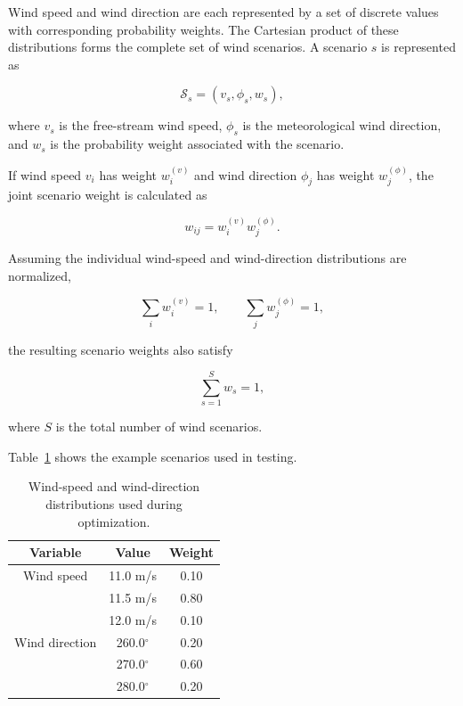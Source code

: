 \documentclass[11pt]{article}
\begin{document}
Wind speed and wind direction are each represented by a set of discrete values with corresponding probability weights. The Cartesian product of these distributions forms the complete set of wind scenarios. A scenario $s$ is represented as

\begin{equation}
    \mathcal{S}_s =
    \left(v_s,\phi_s,w_s\right),
\end{equation}

where $v_s$ is the free-stream wind speed, $\phi_s$ is the meteorological wind direction, and $w_s$ is the probability weight associated with the scenario.

If wind speed $v_i$ has weight $w_i^{(v)}$ and wind direction $\phi_j$ has weight $w_j^{(\phi)}$, the joint scenario weight is calculated as

\begin{equation}
    w_{ij}
    =
    w_i^{(v)} w_j^{(\phi)}.
    \label{eq:scenario-weight}
\end{equation}

Assuming the individual wind-speed and wind-direction distributions are normalized,

\begin{equation}
    \sum_i w_i^{(v)} = 1,
    \qquad
    \sum_j w_j^{(\phi)} = 1,
\end{equation}

the resulting scenario weights also satisfy

\begin{equation}
    \sum_{s=1}^{S} w_s = 1,
\end{equation}

where $S$ is the total number of wind scenarios.

Table~\ref{tab:wind-distributions} shows the example scenarios used in testing.

\begin{table}[htbp]
    \centering
    \caption{Wind-speed and wind-direction distributions used during
    optimization.}
    \label{tab:wind-distributions}

    \begin{tabular}{ccc}
        \toprule
        \textbf{Variable} & \textbf{Value} & \textbf{Weight} \\
        \midrule

        Wind speed & 11.0 m/s & 0.10 \\
                   & 11.5 m/s & 0.80 \\
                   & 12.0 m/s & 0.10 \\

        \midrule

        Wind direction & 260.0$^\circ$ & 0.20 \\
                       & 270.0$^\circ$ & 0.60 \\
                       & 280.0$^\circ$ & 0.20 \\

        \bottomrule
    \end{tabular}
\end{table}
\end{document}
